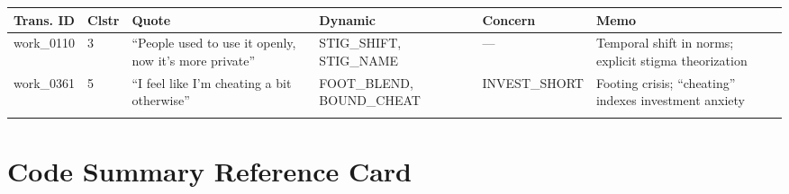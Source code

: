 \documentclass[11pt]{article}
\begin{document}
\begin{center}
\begin{tabular}{|p{1.5cm}|p{1cm}|p{4.5cm}|p{2.5cm}|p{2cm}|p{3.5cm}|}
\hline
\textbf{Trans. ID} & \textbf{Clstr} & \textbf{Quote} & \textbf{Dynamic} & \textbf{Concern} & \textbf{Memo} \\
\hline
work\_0110 & 3 & ``People used to use it openly, now it's more private'' & STIG\_SHIFT, STIG\_NAME & --- & Temporal shift in norms; explicit stigma theorization \\
\hline
work\_0361 & 5 & ``I feel like I'm cheating a bit otherwise'' & FOOT\_BLEND, BOUND\_CHEAT & INVEST\_SHORT & Footing crisis; ``cheating'' indexes investment anxiety \\
\hline
& & & & & \\
\hline
\end{tabular}
\end{center}

\newpage
\section{Code Summary Reference Card}
\end{document}
